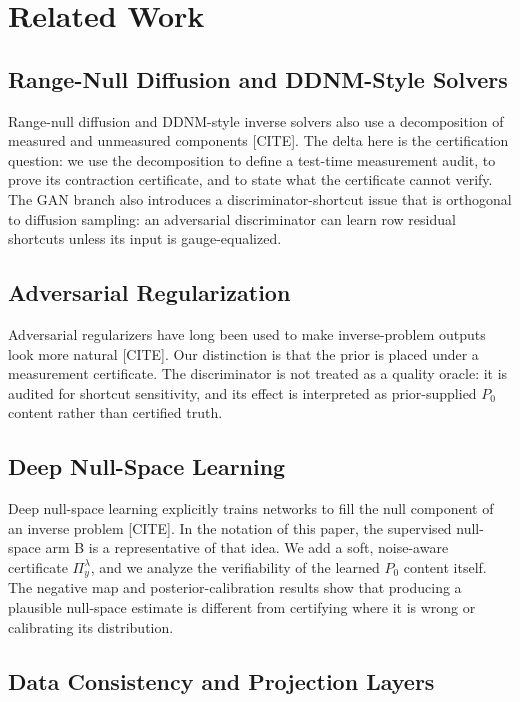 \documentclass[journal]{IEEEtran}
\newcommand{\PZ}{P_{0}}
\newcommand{\Audit}{\Pi_y^\lambda}
\begin{document}
\section{Related Work}
\label{sec:related}

\subsection{Range-Null Diffusion and DDNM-Style Solvers}

Range-null diffusion and DDNM-style inverse solvers also use a decomposition of
measured and unmeasured components [CITE].  The delta here is the certification
question: we use the decomposition to define a test-time measurement audit, to
prove its contraction certificate, and to state what the certificate cannot
verify.  The GAN branch also introduces a discriminator-shortcut issue that is
orthogonal to diffusion sampling: an adversarial discriminator can learn row
residual shortcuts unless its input is gauge-equalized.

\subsection{Adversarial Regularization}

Adversarial regularizers have long been used to make inverse-problem outputs
look more natural [CITE].  Our distinction is that the prior is placed under a
measurement certificate.  The discriminator is not treated as a quality oracle:
it is audited for shortcut sensitivity, and its effect is interpreted as
prior-supplied $\PZ$ content rather than certified truth.

\subsection{Deep Null-Space Learning}

Deep null-space learning explicitly trains networks to fill the null component
of an inverse problem [CITE].  In the notation of this paper, the supervised
null-space arm B is a representative of that idea.  We add a soft,
noise-aware certificate $\Audit$, and we analyze the verifiability of the
learned $\PZ$ content itself.  The negative map and posterior-calibration
results show that producing a plausible null-space estimate is different from
certifying where it is wrong or calibrating its distribution.

\subsection{Data Consistency and Projection Layers}
\end{document}
